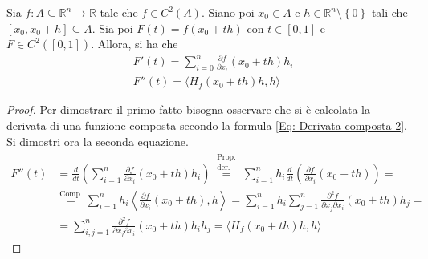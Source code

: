 \begin{proposition} \label{Prop: Premessa al teo Lagrange}
    Sia $f:A \subseteq \mathbb{R}^n \to \mathbb{R}$ tale che $f \in C^2(A)$. Siano poi $x_0 \in A$ e $h \in \mathbb{R}^n \setminus \left\{0\right\}$ tali che $\left[x_0, x_0+h\right] \subseteq A$. Sia poi $F(t)=f(x_0+th)$ con $t \in [0,1]$ e $F \in C^2([0,1])$. Allora, si ha che
    \begin{equation}
        \begin{aligned} \label{Eq: Premessa al teo Lagrange}
            &F'(t)=\sum\limits_{i=0}^{n}{\frac{\partial f}{\partial x_i}(x_0+th)h_i}\\ 
            &F''(t)=\langle H_f(x_0+th)h, h \rangle 
        \end{aligned}
    \end{equation}
    \begin{proof}
        Per dimostrare il primo fatto bisogna osservare che si è calcolata la derivata di una funzione composta secondo la formula \eqref{Eq: Derivata composta 2}.\\
        Si dimostri ora la seconda equazione.
        \begin{equation}
            \begin{aligned}
                F''(t)&= \frac{d}{dt}\left(\sum\limits_{i=1}^{n}{\frac{\partial f}{\partial x_i}(x_0+th)h_i}\right)\overset{\substack{\text{Prop.}\\\text{der.}}}{=}\sum\limits_{i=1}^{n}{h_i\frac{d}{dt}\left(\frac{\partial f}{\partial x_i}(x_0+th)\right)}=\\
                &\overset{\text{Comp.}}{=}\sum\limits_{i=1}^{n}h_i\left\langle\frac{\partial f}{\partial x_i}(x_0+th), h\right\rangle=\sum\limits_{i=1}^{n}h_i \sum\limits_{j=1}^{n}{\frac{\partial^2 f}{\partial x_j \partial x_i}(x_0+th)h_j}=\\
                &=\sum\limits_{i,j=1}^{n}{{\frac{\partial^2 f}{\partial x_j \partial x_i}(x_0+th)h_ih_j}}= \langle H_f(x_0+th)h,h\rangle 
            \end{aligned}
        \end{equation}
    \end{proof}
\end{proposition}
